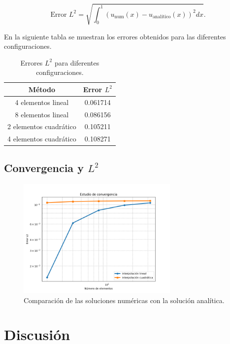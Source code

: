\begin{equation}
\text{Error } L^2 = \sqrt{\int_0^1 \left( u_{\text{num}}(x) - u_{\text{analítico}}(x) \right)^2 dx}.
\end{equation}

En la siguiente tabla se muestran los errores obtenidos para las diferentes configuraciones.

\begin{table}[H]
\centering
\begin{tabular}{|c|c|}
\hline
Método & Error \(L^2\) \\
\hline
4 elementos lineal & 0.061714 \\
8 elementos lineal & 0.086156 \\
2 elementos cuadrático & 0.105211 \\
4 elementos cuadrático & 0.108271 \\
\hline
\end{tabular}
\caption{Errores \( L^2 \) para diferentes configuraciones.}
\label{tab:erroresL2}
\end{table}

\section{Convergencia y \(L^2\)}

\begin{figure}[H]
    \centering
    \includegraphics[width=0.7\textwidth]{figuras/galerkin_l2_convergencia.png}
    \caption{Comparación de las soluciones numéricas con la solución analítica.}
\end{figure}
    


\chapter{Discusión}

